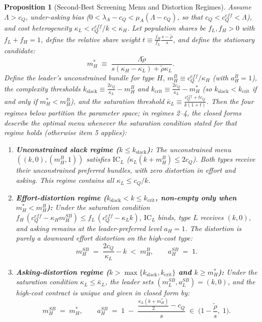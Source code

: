 \documentclass[11pt]{article}
\newtheorem{proposition}{Proposition}
\begin{document}
\begin{proposition}[Second-Best Screening Menu and Distortion Regimes]
\label{prop:distortion}
Assume $\Lambda > c_Q$, under-asking bias ($0 < \lambda_A - c_Q < \mu_A(\Lambda - c_Q)$, so that $c_Q < c_Q^{eff} < \Lambda$), and cost heterogeneity $\kappa_L < c_Q^{eff}/k < \kappa_H$. Let population shares be $f_L, f_H > 0$ with $f_L + f_H = 1$, define the relative share weight $t \equiv \frac{f_H}{f_L}\frac{s - \tilde\rho}{s}$, and define the stationary candidate:
\[
m_H^* \;\equiv\; \frac{\Lambda \tilde\rho}{s(\kappa_H - \kappa_L) + \tilde\rho\kappa_L}.
\]
Define the leader's unconstrained bundle for type $H$, $m_H^B \equiv c_Q^{eff}/\kappa_H$ (with $a_H^B = 1$), the complexity thresholds $k_{\text{slack}} \equiv \frac{2 c_Q}{\kappa_L} - m_H^B$ and $k_{\text{crit}} \equiv \frac{2 c_Q}{\kappa_L} - m_H^*$ (so $k_{\text{slack}} < k_{\text{crit}}$ if and only if $m_H^* < m_H^B$), and the saturation threshold $\bar\kappa_L \equiv \frac{c_Q^{eff} + t c_Q}{k(1 + t)}$.
Then the four regimes below partition the parameter space; in regimes 2--4, the closed forms describe the optimal menu whenever the saturation condition stated for that regime holds (otherwise item 5 applies):
\begin{enumerate}[leftmargin=*]
\item \textbf{Unconstrained slack regime ($k \le k_{\text{slack}}$):} The unconstrained menu $((k, 0), (m_H^B, 1))$ satisfies $\text{IC}_L$ ($\kappa_L(k + m_H^B) \le 2 c_Q$). Both types receive their unconstrained preferred bundles, with zero distortion in effort and asking. This regime contains all $\kappa_L \le c_Q/k$.
\item \textbf{Effort-distortion regime ($k_{\text{slack}} < k \le k_{\text{crit}}$, non-empty only when $m_H^* < m_H^B$):} Under the saturation condition $f_H\,(c_Q^{eff} - \kappa_H m_H^{SB}) \le f_L\,(c_Q^{eff} - \kappa_L k)$, $\text{IC}_L$ binds, type $L$ receives $(k,0)$, and asking remains at the leader-preferred level $a_H = 1$. The distortion is purely a downward effort distortion on the high-cost type:
\[
m_H^{SB} \;=\; \frac{2 c_Q}{\kappa_L} - k \;<\; m_H^B, \qquad a_H^{SB} \;=\; 1.
\]
\item \textbf{Asking-distortion regime ($k > \max\{k_{\text{slack}}, k_{\text{crit}}\}$ and $k \ge m_H^*$):} Under the saturation condition $\kappa_L \le \bar\kappa_L$, the leader sets $(m_L^{SB}, a_L^{SB}) = (k, 0)$, and the high-cost contract is unique and given in closed form by:
\[
m_H^{SB} \;=\; m_H^*, \qquad a_H^{SB} \;=\; 1 \;-\; \frac{\frac{\kappa_L(k + m_H^*)}{2} - c_Q}{s} \;\in\; \Big(1 - \frac{\tilde\rho}{s},\; 1\Big).
\]
\end{enumerate}
\end{proposition}
\end{document}
